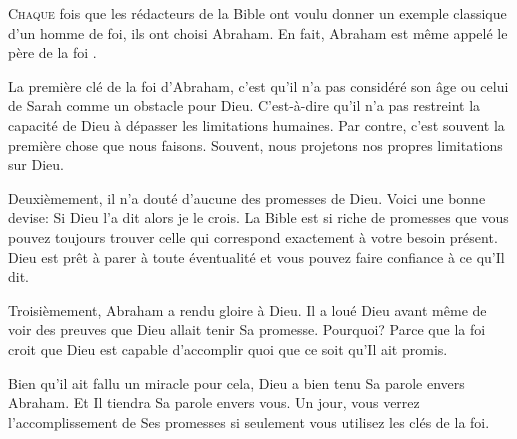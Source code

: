 



\lettrine{C}{haque} fois que les rédacteurs de la Bible ont voulu
 donner un exemple classique d'un homme de foi, ils ont choisi Abraham.
 En fait, Abraham est même appelé \Og le père de la foi \Fg{}.

La première clé de la foi d'Abraham, c'est qu'il n'a pas considéré
 son âge ou celui de Sarah comme un obstacle pour Dieu.
 C'est-à-dire qu'il n'a pas restreint la capacité de Dieu
 à dépasser les limitations humaines.
 Par contre, c'est souvent la première chose que nous faisons.
 Souvent, nous projetons nos propres limitations sur Dieu.

Deuxièmement, il n'a douté d'aucune des promesses de Dieu.
 Voici une bonne devise: \Og Si Dieu l'a dit alors je le crois. \Fg{}
 La Bible est si riche de promesses que vous pouvez toujours trouver
 celle qui correspond exactement à votre besoin présent.
 Dieu est prêt à parer à toute éventualité et vous pouvez
 faire confiance à ce qu'Il dit.

Troisièmement, Abraham a rendu gloire à Dieu.
 Il a loué Dieu avant même de voir des preuves que Dieu
 allait tenir Sa promesse. Pourquoi? Parce que la foi croit
 que Dieu est capable d'accomplir quoi que ce soit qu'Il ait promis.


Bien qu'il ait fallu un miracle pour cela, Dieu a bien tenu Sa parole
 envers Abraham. Et Il tiendra Sa parole envers vous.
 Un jour, vous verrez l'accomplissement de Ses promesses
 si seulement vous utilisez les clés de la foi.

\dvrule



